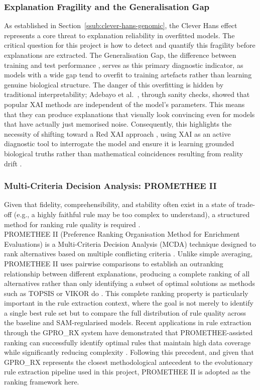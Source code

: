 \subsubsection{Explanation Fragility and the Generalisation Gap}
\label{ssub:fragility-gap}
As established in Section~\ref{ssub:clever-hans-genomic}, the Clever Hans effect represents a core
threat to explanation reliability in overfitted models. The critical question for this project is how
to detect and quantify this fragility before explanations are extracted. The Generalisation Gap, the
difference between training and test performance \cite{Keskar2016,Springer2024}, serves as this
primary diagnostic indicator, as models with a wide gap tend to overfit to training artefacts rather
than learning genuine biological structure. The danger of this overfitting is hidden by traditional
interpretability; Adebayo et al.~\cite{Adebayo2018}, through sanity checks, showed that popular XAI
methods are independent of the model's parameters. This means that they can produce explanations that
visually look convincing even for models that have actually just memorised noise. Consequently, this
highlights the necessity of shifting toward a Red XAI approach \cite{Biecek2024}, using XAI as an
active diagnostic tool to interrogate the model and ensure it is learning grounded biological truths
rather than mathematical coincidences resulting from reality drift \cite{Longo2024}.

\subsubsection{Multi-Criteria Decision Analysis: PROMETHEE II}
\label{ssub:promethee}
Given that fidelity, comprehensibility, and stability often exist in a state of trade-off (e.g., a
highly faithful rule may be too complex to understand), a structured method for ranking rule quality
is required \cite{Yedjour2024,Ye2024,Brans1985}.
\\
PROMETHEE II (Preference Ranking Organisation Method for Enrichment Evaluations) is a Multi-Criteria
Decision Analysis (MCDA) technique designed to rank alternatives based on multiple conflicting
criteria \cite{Yedjour2024,Matejova2025}. Unlike simple averaging, PROMETHEE II uses pairwise
comparisons to establish an outranking relationship between different explanations, producing a
complete ranking of all alternatives rather than only identifying a subset of optimal solutions as
methods such as TOPSIS or VIKOR do \cite{Yedjour2024,Matejova2025}. This complete ranking property is
particularly important in the rule extraction context, where the goal is not merely to identify a
single best rule set but to compare the full distribution of rule quality across the baseline and
SAM-regularised models. Recent applications in rule extraction through the GPRO\_RX system have
demonstrated that PROMETHEE-assisted ranking can successfully identify optimal rules that maintain
high data coverage while significantly reducing complexity \cite{Yedjour2024}. Following this
precedent, and given that GPRO\_RX represents the closest methodological antecedent to the
evolutionary rule extraction pipeline used in this project, PROMETHEE II is adopted as the ranking
framework here.

